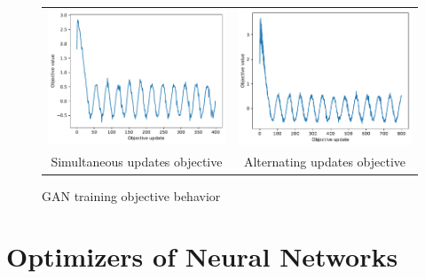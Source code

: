 \documentclass[12pt]{article}
\newcommand{\figw}{7cm}
\begin{document}
\begin{figure}
\centering
\begin{tabular}{cc}
  \includegraphics[width=\figw]{hw2/codes/gan/plots/simultaneous/simultaneous_objectives.pdf} &   \includegraphics[width=\figw]{hw2/codes/gan/plots/alternating/alternating_objectives.pdf} \\
Simultaneous updates objective & Alternating updates objective \\[6pt]
\end{tabular}
\caption{GAN training objective behavior} \label{fig:objectives}
\end{figure}

\section{Optimizers of Neural Networks}
\end{document}
